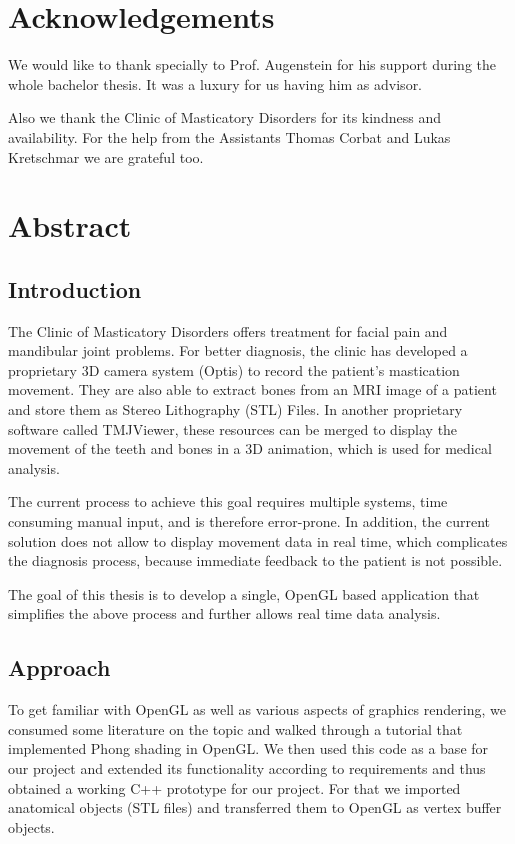 \section*{Acknowledgements}

We would like to thank specially to Prof. Augenstein for his support during the whole bachelor thesis. It was a luxury for us having him as advisor.

Also we thank the Clinic of Masticatory Disorders for its kindness and availability. For the help from the Assistants Thomas Corbat and Lukas Kretschmar we are grateful too.
\newpage


\section{Abstract}
	\subsection{Introduction}
	
	The Clinic of Masticatory Disorders offers treatment for facial pain and mandibular joint problems. For better diagnosis, the clinic has developed a proprietary  3D  camera  system  (Optis)  to  record  the  patient's  mastication movement. They are also able to extract bones from an MRI image of a patient and  store  them  as  Stereo  Lithography  (STL)  Files.  In  another  proprietary software  called  TMJViewer,  these  resources  can  be  merged  to display  the movement of the teeth and bones in a 3D animation, which is used for medical analysis. 
	
	The current process to achieve this goal requires multiple systems, time consuming manual input, and is therefore error-prone. In addition, the current solution does not allow to display movement data in real time, which complicates the diagnosis process, because immediate feedback to the patient is not possible. 
	
	The goal of this thesis is to develop a single, OpenGL based application that simplifies the above process and further allows real time data analysis.
	
	\subsection{Approach}
	
	To get familiar with OpenGL as well as various aspects of graphics rendering, we consumed some literature on the topic and walked through a tutorial that implemented Phong shading in OpenGL. We then used this code as a base for our project and extended its functionality according to requirements and thus obtained a working C++ prototype for our project. For that  we  imported  anatomical  objects  (STL  files)  and  transferred  them  to OpenGL  as  vertex buffer  objects.  
	
